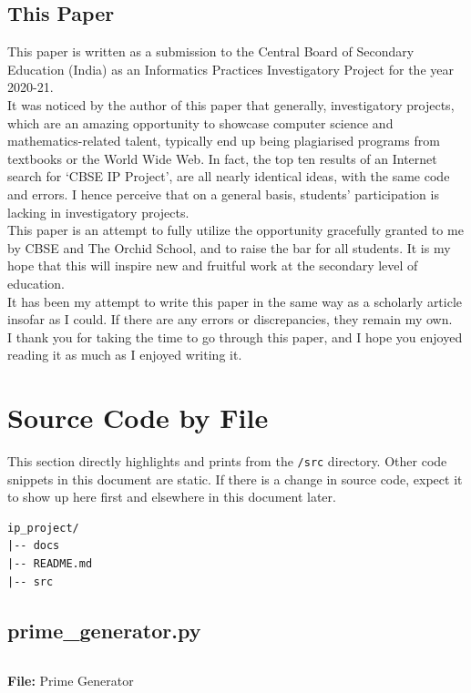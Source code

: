 \documentclass[twoside]{article}
\newenvironment{longlisting}{\captionsetup{type=listing}}{}
\begin{document}

\subsection{This Paper}
This paper is written as a submission to the Central Board of Secondary Education (India) as an
Informatics Practices Investigatory Project for the year 2020-21. \\
It was noticed by the author of this paper that generally, investigatory projects, which are an
amazing opportunity to showcase computer science and mathematics-related talent, typically end up being
plagiarised programs from textbooks or the World Wide Web. In fact, the top ten results of an
Internet search for `CBSE IP Project', are all nearly identical ideas, with the same code and
errors. I hence perceive that on a general basis, students' participation is lacking in
investigatory projects.\\
This paper is an attempt to fully utilize the opportunity gracefully granted to me by CBSE and The
Orchid School, and to raise the bar for all students. It is my hope that this will inspire new and
fruitful work at the secondary level of education.\\
It has been my attempt to write this paper in the same way as a scholarly article insofar as I
could. If there are any errors or discrepancies, they remain my own.\\
I thank you for taking the time to go through this paper, and I hope you enjoyed reading it as much
as I enjoyed writing it.\\


\cleardoublepage


\section{Source Code by File}
This section directly highlights and prints from the \texttt{/src} directory. Other code snippets in
this document are static. If there is a change in source code, expect it to show up here first and
elsewhere in this document later.
\begin{verbatim}
ip_project/
|-- docs
|-- README.md
|-- src
\end{verbatim}

\subsection{prime\_generator.py}
\begin{longlisting}
\inputminted{python}{../src/prime_generator.py}
\caption{\textbf{File:} Prime Generator}
\end{longlisting}
\end{document}
